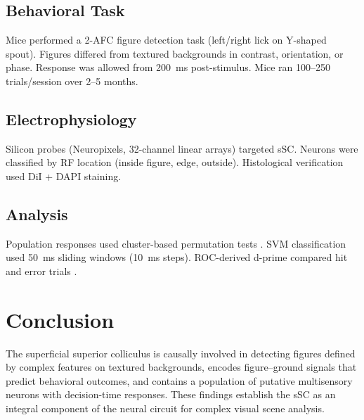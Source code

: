 \documentclass[11pt]{article}
\begin{document}
\subsection{Behavioral Task}
Mice performed a 2-AFC figure detection task (left/right lick on Y-shaped spout). Figures differed from textured backgrounds in contrast, orientation, or phase. Response was allowed from 200~ms post-stimulus. Mice ran 100--250 trials/session over 2--5 months.

\subsection{Electrophysiology}
Silicon probes (Neuropixels, 32-channel linear arrays) targeted sSC. Neurons were classified by RF location (inside figure, edge, outside). Histological verification used DiI + DAPI staining.

\subsection{Analysis}
Population responses used cluster-based permutation tests \citep{maris2007nonparametric}. SVM classification used 50~ms sliding windows (10~ms steps). ROC-derived d-prime compared hit and error trials \citep{green1966signal}.

\section{Conclusion}

The superficial superior colliculus is causally involved in detecting figures defined by complex features on textured backgrounds, encodes figure--ground signals that predict behavioral outcomes, and contains a population of putative multisensory neurons with decision-time responses. These findings establish the sSC as an integral component of the neural circuit for complex visual scene analysis.



\end{document}
